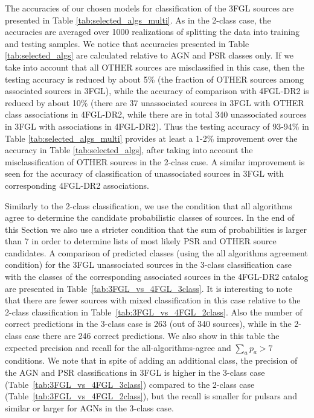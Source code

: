 The accuracies of our chosen models for classification of the 3FGL sources are presented in Table \ref{tab:selected_algs_multi}.
As in the 2-class case, the accuracies are averaged over 1000 realizations of splitting the data into training and testing samples.
We notice that accuracies presented in Table \ref{tab:selected_algs} are calculated relative to AGN and PSR classes only. If we take into account that all OTHER sources
are misclassified in this case, then the testing accuracy is reduced by about 5\% (the fraction of OTHER sources among associated sources in 3FGL),
while the accuracy of comparison with 4FGL-DR2 is reduced by about 10\% (there are 37 unassociated sources in 3FGL with OTHER class associations in 4FGL-DR2,
while there are in total 340 unassociated sources in 3FGL with associations in 4FGL-DR2).
Thus the testing accuracy of 93-94\% in Table \ref{tab:selected_algs_multi} provides at least a 1-2\% improvement over the accuracy in Table \ref{tab:selected_algs},
after taking into account the misclassification of OTHER sources in the 2-class case.
A similar improvement is seen for the accuracy of classification of unassociated sources in 3FGL with corresponding 4FGL-DR2 associations.

Similarly to the 2-class classification, we use the condition that all algorithms agree to determine the candidate probabilistic classes of sources.
In the end of this Section we also use a stricter condition that the sum of probabilities is larger than 7 in order to determine lists of most likely PSR and OTHER source candidates.
A comparison of predicted classes (using the all algorithms agreement condition) for the 3FGL unassociated sources in the 3-class classification case with the classes of the corresponding associated sources in the 4FGL-DR2 catalog are presented in Table~\ref{tab:3FGL_vs_4FGL_3class}.
It is interesting to note that there are fewer sources with mixed classification in this case relative to the 2-class classification in 
Table~\ref{tab:3FGL_vs_4FGL_2class}.
Also the number of correct predictions in the 3-class case is 263 (out of 340 sources), while in the 2-class case there are 246 correct predictions.
We also show in this table the expected precision and recall for the all-algorithms-agree and $\sum_a p_a > 7$
conditions.
We note that in spite of adding an additional class, the precision of the AGN and PSR classifications in 3FGL
is higher in the 3-class case (Table~\ref{tab:3FGL_vs_4FGL_3class}) compared to the 2-class case
(Table~\ref{tab:3FGL_vs_4FGL_2class}), but the recall is smaller for pulsars and similar or larger for AGNs in the 3-class case.

